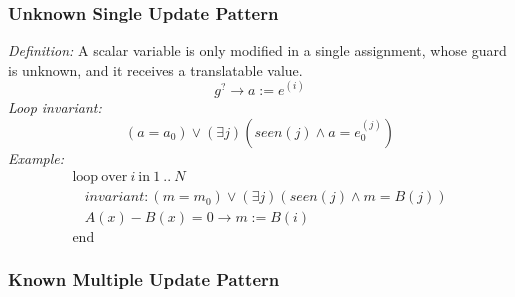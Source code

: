 \documentclass[a4paper,10pt]{article}
\newcommand{\idx}{\ensuremath{i}\xspace}
\newcommand{\at}[1]{{(#1)}}
\newcommand{\KWloop}{\ensuremath{\mathrm{loop}~}}
\newcommand{\KWend}{\ensuremath{\mathrm{end}~}}
\newcommand{\KWover}{\ensuremath{\mathrm{over}~}}
\newcommand{\KWin}{\ensuremath{~\mathrm{in}~}}
\newcommand{\seen}[1]{\ensuremath{\mathit{seen}(#1)}\xspace}
\newcommand{\loopinvariant}{\noindent\textit{Loop invariant:}\xspace}
\newcommand{\patterndef}{\noindent\textit{Definition:}\xspace}
\newcommand{\patternexample}{\noindent\textit{Example:}\xspace}
\begin{document}
\subsubsection*{Unknown Single Update Pattern}

\patterndef A scalar variable is only modified in a single assignment, whose
guard is unknown, and it receives a translatable value.
%
$$g^? \rightarrow a := e^\at{\idx}$$
%
\loopinvariant
%
$$(a = a_0) \lor (\exists j)(\seen{j} \land a = e_0^\at{j})$$
%
\patternexample
$$\begin{array}{l}
  \KWloop \KWover i \KWin 1~..~N \\
  ~~~~ \textit{invariant}: (m = m_0) \lor (\exists j)(\seen{j} \land m = B(j))\\
  ~~~~ A(x)-B(x)=0 \rightarrow m := B(i)\\
  \KWend
\end{array}$$

\subsubsection*{Known Multiple Update Pattern}
\end{document}
